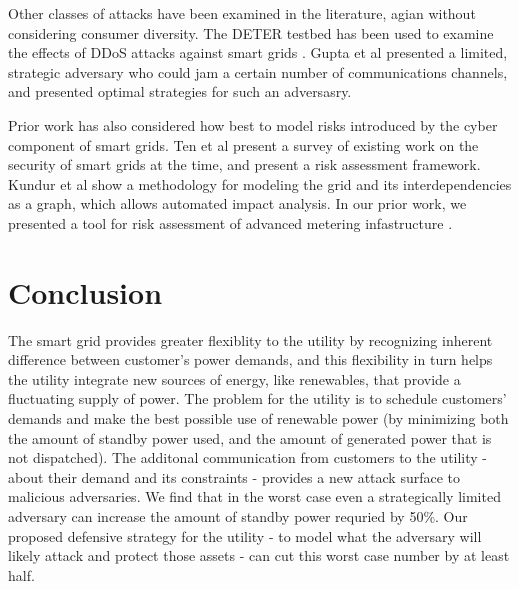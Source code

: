\documentclass[conference]{IEEEtran}
\begin{document}
Other classes of attacks have been examined in the literature, agian without considering consumer diversity. The DETER testbed has been used to examine the effects of DDoS attacks against smart grids \cite{hussain2012ncs}. Gupta et al \cite{gupta2010optimal} presented a limited, strategic adversary who could jam a certain number of communications channels, and presented optimal strategies for such an adversasry. 

Prior work has also considered how best to model risks introduced by the cyber component of smart grids. Ten et al \cite{ten2010cybersecurity} present a survey of existing work on the security of smart grids at the time, and present a risk assessment framework. Kundur et al \cite{kundur2010towards} show a methodology for modeling the grid and its interdependencies as a graph, which allows automated impact analysis. In our prior work, we presented a tool for risk assessment of advanced metering infastructure \cite{shawly2014risk}.


\section{Conclusion}
\label{Conclusion}

The smart grid provides greater flexiblity to the utility by recognizing inherent difference between customer's power demands, and this flexibility in turn helps the utility integrate new sources of energy, like renewables, that provide a fluctuating supply of power.  The problem for the utility is to schedule customers' demands and make the best possible use of renewable power (by minimizing both the amount of standby power used, and the amount of generated power that is not dispatched).  The additonal communication from customers to the utility - about their demand and its constraints - provides a new attack surface to malicious adversaries.  We find that in the worst case even a strategically limited adversary can increase the amount of standby power requried by 50\%.  Our proposed defensive strategy for the utility - to model what the adversary will likely attack and protect those assets - can cut this worst case number by at least half.

{\footnotesize


}
\end{document}
